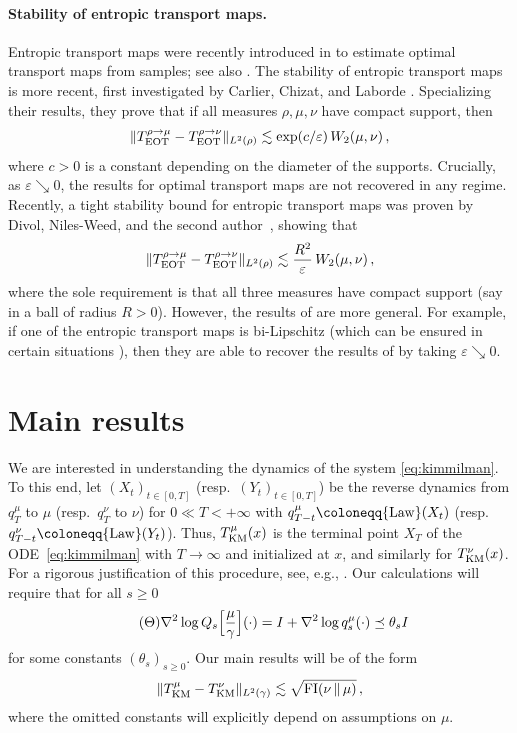 \documentclass[12pt]{article}
\newcommand{\1}{\mathds{1}}
\newcommand*{\defeq}{\coloneqq}
\newcommand{\eps}{\varepsilon}
\newcommand{\mmid}{\,\Vert\,}
\def\defeq{\coloneqq} %
\theoremstyle{plain}
\theoremstyle{definition}
\theoremstyle{remark}
\begin{document}
\paragraph{Stability of entropic transport maps.}
Entropic transport maps were recently introduced in \cite{pooladian2021entropic} to estimate optimal transport maps from samples; see also \cite{rigollet2025sample,
pooladian2023minimax}. The stability of entropic transport maps is more recent, first investigated by Carlier, Chizat, and Laborde \cite{carlier2024displacement}. Specializing their results, they prove that if all measures $\rho,\mu,\nu$ have compact support, then  
\begin{align*}
    \|T^{\rho\to\mu}_{\rm EOT} - T_{\rm EOT}^{\rho\to\nu}\|_{L^2(\rho)} \lesssim \exp(c/\eps)\, W_2(\mu,\nu)\,,
\end{align*}
where $c > 0$ is a constant depending on the diameter of the supports. Crucially, as $\eps \searrow 0$, the results for optimal transport maps are not recovered in any regime. Recently, a tight stability bound for entropic transport maps was proven by Divol, Niles-Weed, and {the second author}~\cite{divol2025tight}, showing that
\begin{align*}
    \|T^{\rho\to\mu}_{\rm EOT} - T_{\rm EOT}^{\rho\to\nu}\|_{L^2(\rho)} \lesssim \frac{R^2}{\eps}\,W_2(\mu,\nu)\,,
\end{align*}
where the sole requirement is that all three measures have compact support (say in a ball of radius $R > 0$). However, the results of \cite{divol2025tight} are more general. For example, if one of the entropic transport maps is bi-Lipschitz (which can be ensured in certain situations \cite{chewi2023entropic}), then they are able to recover the results of \cite{manole2024plugin} by taking $\eps \searrow 0$.

\section{Main results}\label{sec:main_results}
We are interested in understanding the dynamics of the system \eqref{eq:kimmilman}. To this end, let $(X_t)_{t\in[0,T]}$ (resp.\ $(Y_t)_{t\in[0,T]}$) be the reverse dynamics from ${q_T^\mu}$ to $\mu$ (resp.\ ${q_T^\nu}$ to $\nu$) for $0\ll T < +\infty$ with $q^\mu_{{T-t}} \defeq {\rm{Law}}(X_t)$ (resp.\ $q^\nu_{{T-t}} \defeq {\rm{Law}}(Y_t)$). Thus, $T_{\rm KM}^\mu(x)$ is the terminal point $X_T$ of the ODE~\eqref{eq:kimmilman} with $T\to\infty$ and initialized at $x$, and similarly for $T_{\rm KM}^\nu(x)$.
For a rigorous justification of this procedure, see, e.g., \cite{kim2012generalization, MikShe23HeatFlow}. Our calculations will require that for all $s \geq 0$
\begin{align}\label{eq:assump}\tag{$\Theta$}
\nabla^2 \log Q_{s}\Bigl[\frac{\mu}{\gamma}\Bigr] (\cdot) = I + \nabla^2 \log q_s^\mu(\cdot) \preceq {\theta}_s I
\end{align}
{for some constants $(\theta_s)_{s \ge 0}$.} Our main results will be of the form
\begin{align*}
    \|T_{\rm KM}^\mu - T_{\rm KM}^\nu \|_{L^2(\gamma)} \lesssim \sqrt{{\rm FI}(\nu\mmid\mu)}\,,
\end{align*}
{where the omitted constants will explicitly depend on assumptions on $\mu$.}
\end{document}
